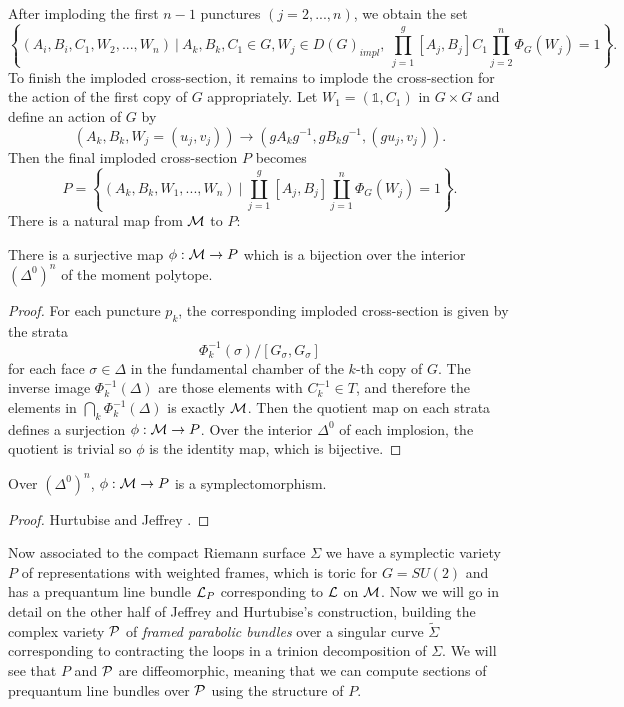 	After imploding the first $n-1$ punctures $(j=2,...,n)$, we obtain the set
	\begin{equation}
		\left\{
		(A_i,B_i,C_1,W_2,...,W_n)~|~ A_k,B_k,C_1 \in G, W_j \in D(G)_{impl},~ \prod_{j=1}^{g}[A_j,B_j]C_1\prod_{j=2}^{n} \Phi_G(W_j) = 1 
		\right\}.
	\end{equation}
	To finish the imploded cross-section, it remains to implode the cross-section for the action of the first copy of $G$ appropriately. Let $W_1 = (\mathds{1},C_1)$ in $G\times G$ and define an action of $G$ by
	\begin{equation}
		\label{e:first-action}
		\left(A_k,B_k,W_j=(u_j,v_j)\right) \to (gA_kg^{-1}, gB_kg^{-1}, (gu_j,v_j)).
	\end{equation}
	Then the final imploded cross-section $P$ becomes \cite{hurtubise_representations_2000}
	\begin{equation}
		\label{e:P-def}
		P = \left\{(A_k,B_k,W_1,...,W_n)~|~ \coprod_{j=1}^g[A_j,B_j]\coprod_{j=1}^n \Phi_G(W_j)=1\right\}.
	\end{equation}
	There is a natural map from $\mathcal{M}$ to $P$:
	\begin{lemma}
		There is a surjective map $\phi:\mathcal{M}\to P$ which is a bijection over the interior $(\Delta^0)^n$ of the moment polytope. 
	\end{lemma}
	\begin{proof}
		For each puncture $p_k$, the corresponding imploded cross-section is given by the strata
		\begin{equation}
			\Phi_k^{-1}(\sigma)/[G_\sigma, G_\sigma]
		\end{equation}
		for each face $\sigma \in \Delta$ in the fundamental chamber of the $k$-th copy of $G$. The inverse image $\Phi_k^{-1}(\Delta)$ are those elements with $C_k^{-1} \in T$, and therefore the elements in $\bigcap_k \Phi_k^{-1} (\Delta)$ is exactly $\mathcal{M}$. Then the quotient map on each strata defines a surjection $\phi:\mathcal{M}\to P$. Over the interior $\Delta^0$ of each implosion, the quotient is trivial so $\phi$ is the identity map, which is bijective. 
	\end{proof}
	\begin{theorem}
		Over $(\Delta^0)^n$, $\phi:\mathcal{M} \to P$ is a symplectomorphism.
	\end{theorem}
	\begin{proof}
		Hurtubise and Jeffrey \cite[Proposition 2.37]{hurtubise_representations_2000}.
	\end{proof}
	

	\pagebreak
	Now associated to the compact Riemann surface $\Sigma$ we have a symplectic variety $P$ of representations with weighted frames, which is toric for $G=SU(2)$ and has a prequantum line bundle $\mathcal{L}_P$ corresponding to $\mathcal{L}$ on $\mathcal{M}$. Now we will go in detail on the other half of Jeffrey and Hurtubise's construction, building the complex variety $\mathcal{P}$ of \emph{framed parabolic bundles} over a singular curve $\tilde{\Sigma}$ corresponding to contracting the loops in a trinion decomposition of $\Sigma$. We will see that $P$ and $\mathcal{P}$ are diffeomorphic, meaning that we can compute sections of prequantum line bundles over $\mathcal{P}$ using the structure of $P$.
	
